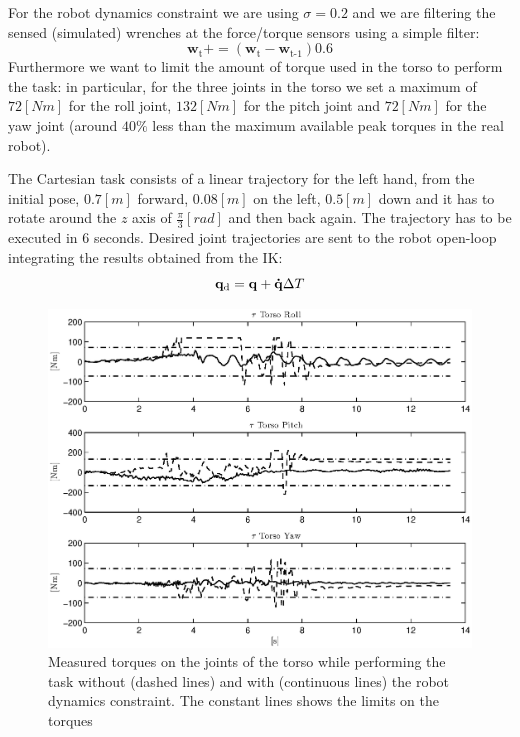 For the robot dynamics constraint we are using $\sigma = 0.2$ and we are filtering the sensed (simulated) wrenches at the force/torque sensors using a simple filter:
\begin{equation}
\mathbf{w}_\text{t} \mathrel{{+}{=}} \left( \mathbf{w}_\text{t} - \mathbf{w}_\text{t-1} \right) 0.6
\end{equation}
Furthermore we want to limit the amount of torque used in the torso to perform the task: in particular, for the three joints in the torso we set a maximum of $72 \left[ Nm\right]$ for the roll joint, $132 \left[ Nm\right]$ for the pitch joint and $72 \left[ Nm\right]$ for the yaw joint (around $40\%$ less than the maximum available peak torques in the real robot). 

The Cartesian task consists of a linear trajectory for the left hand, from the initial pose, $0.7 \left[ m \right]$ forward, $0.08 \left[ m \right]$ on the left, $0.5 \left[ m \right]$ down and it has to rotate around the $z$ axis of $\frac{\pi}{3} \left[ rad \right]$ and then back again. The trajectory has to be executed in 6 seconds. Desired joint trajectories are sent to the robot open-loop integrating the results obtained from the IK:
\begin{equation}
\mathbf{q}_\text{d} = \mathbf{q} + \mathbf{\dot{q}} \Delta T
\end{equation}

\begin{figure}[htb] 
\centering 
\includegraphics[width=\textwidth]{images/tau_torso.eps} 
\caption{Measured torques on the joints of the torso while performing the task without (dashed lines) and with (continuous lines) the robot dynamics constraint. The constant lines shows the limits on the torques} 
\label{tau_torso}
\end{figure}

